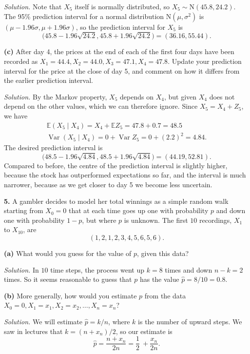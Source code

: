 \documentclass[
  a4paper,
]{article}
\theoremstyle{definition}
\theoremstyle{definition}
\theoremstyle{definition}
\theoremstyle{remark}
\begin{document}
\emph{Solution.} Note that \(X_5\) itself is normally distributed, so \(X_5 \sim \text{N}(45.8,24.2)\). The 95\% prediction interval for a normal distribution \(\text{N}(\mu, \sigma^2)\) is \((\mu - 1.96\sigma, \mu + 1.96\sigma)\), so the prediction interval for \(X_5\) is
\[ \big(45.8 - 1.96\sqrt{24.2},  45.8 + 1.96\sqrt{24.2}\big) = (36.16, 55.44) . \]

\textbf{(c)} After day 4, the prices at the end of each of the first four days have been recorded as \(X_1 = 44.4, X_2 = 44.0, X_3 = 47.1, X_4 = 47.8\). Update your prediction interval for the price at the close of day 5, and comment on how it differs from the earlier prediction interval.

\emph{Solution.} By the Markov property, \(X_5\) depends on \(X_4\), but given \(X_4\) does not depend on the other values, which we can therefore ignore. Since \(X_5 = X_4 + Z_5\), we have
\begin{gather*}
  \mathbb E(X_5 \mid X_4) = X_4 + \mathbb E Z_5 = 47.8 + 0.7 = 48.5 \\
  \operatorname{Var}(X_5 \mid X_4) = 0 + \operatorname{Var}Z_5 = 0 + (2.2)^2 = 4.84.
  \end{gather*}
The desired prediction interval is
\[ \big(48.5 - 1.96\sqrt{4.84},  48.5+ 1.96\sqrt{4.84}\big) = (44.19, 52.81) . \]
Compared to before, the centre of the prediction interval is slightly higher, because the stock has outperformed expectations so far, and the interval is much narrower, because as we get closer to day 5 we become less uncertain.

\textbf{5.} A gambler decides to model her total winnings as a simple random walk starting from \(X_0 = 0\) that at each time goes up one with probability \(p\) and down one with probability \(1-p\), but where \(p\) is unknown. The first \(10\) recordings, \(X_1\) to \(X_{10}\), are
\[ (1, 2, 1, 2, 3, 4, 5, 6, 5, 6) . \]

\textbf{(a)} What would you guess for the value of \(p\), given this data?

\emph{Solution.} In \(10\) time steps, the process went up \(k = 8\) times and down \(n - k = 2\) times. So it seems reasonable to guess that \(p\) has the value \(\hat p = 8/10 = 0.8\).

\textbf{(b)} More generally, how would you estimate \(p\) from the data \(X_0 = 0, X_1 = x_1, X_2 = x_2, \dots, X_n = x_n\)?

\emph{Solution.} We will estimate \(\hat p = k/n\), where \(k\) is the number of upward steps. We saw in lectures that \(k = (n + x_n)/2\), so our estimate is
\[ \hat p = \frac{n + x_n}{2n} = \frac12\ + \frac{x_n}{2n} . \]
\end{document}
